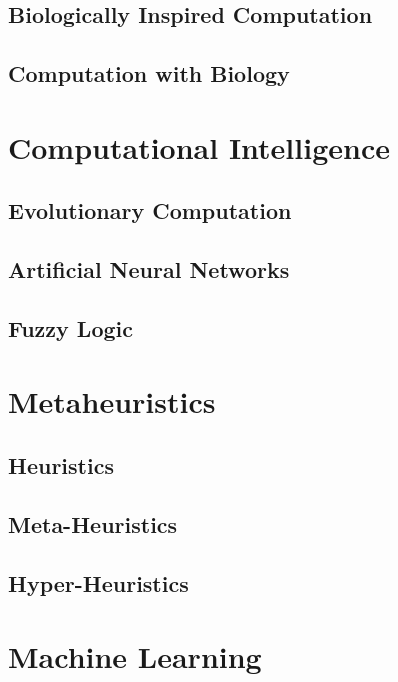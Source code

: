 \documentclass[a4paper, 11pt]{article}
\begin{document}
\subsection{Biologically Inspired Computation}

\subsection{Computation with Biology}


% 
% 
\section{Computational Intelligence}
\label{sec:computationl_intelligence}

\subsection{Evolutionary Computation}

\subsection{Artificial Neural Networks}

\subsection{Fuzzy Logic}

% 
% 
\section{Metaheuristics}
\label{sec:metaheuristics}

\subsection{Heuristics}

\subsection{Meta-Heuristics}

\subsection{Hyper-Heuristics}


% 
% 
\section{Machine Learning}
\label{sec:machine_learning}
\end{document}

